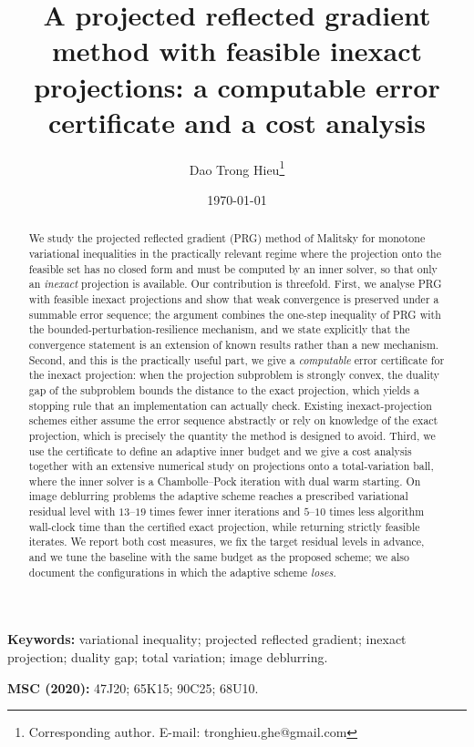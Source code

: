 \documentclass[11pt]{article}
\title{A projected reflected gradient method with feasible inexact
projections: a computable error certificate and a cost analysis}
\author{Dao Trong Hieu\thanks{Corresponding author. E-mail:
tronghieu.ghe@gmail.com}}
\date{\today}
\theoremstyle{plain}
\theoremstyle{definition}
\theoremstyle{remark}
\begin{document}
\maketitle

\begin{abstract}
We study the projected reflected gradient (PRG) method of Malitsky for
monotone variational inequalities in the practically relevant regime where the
projection onto the feasible set has no closed form and must be computed by an
inner solver, so that only an \emph{inexact} projection is available. Our
contribution is threefold. First, we analyse PRG with feasible inexact
projections and show that weak convergence is preserved under a summable error
sequence; the argument combines the one-step inequality of PRG with the
bounded-perturbation-resilience mechanism, and we state explicitly that the
convergence statement is an extension of known results rather than a new
mechanism. Second, and this is the practically useful part, we give a
\emph{computable} error certificate for the inexact projection: when the
projection subproblem is strongly convex, the duality gap of the subproblem
bounds the distance to the exact projection, which yields a stopping rule that
an implementation can actually check. Existing inexact-projection schemes
either assume the error sequence abstractly or rely on knowledge of the exact
projection, which is precisely the quantity the method is designed to avoid.
Third, we use the certificate to define an adaptive inner budget and we give a
cost analysis together with an extensive numerical study on projections onto a
total-variation ball, where the inner solver is a Chambolle--Pock iteration
with dual warm starting. On image deblurring problems the adaptive scheme
reaches a prescribed variational residual level with $13$--$19$ times fewer
inner iterations and $5$--$10$ times less algorithm wall-clock time than the
certified exact projection, while returning strictly feasible iterates. We
report both cost measures, we fix the target residual levels in advance, and we
tune the baseline with the same budget as the proposed scheme; we also document
the configurations in which the adaptive scheme \emph{loses}.
\end{abstract}

\noindent\textbf{Keywords:} variational inequality; projected reflected
gradient; inexact projection; duality gap; total variation; image deblurring.

\noindent\textbf{MSC (2020):} 47J20; 65K15; 90C25; 68U10.
\end{document}
